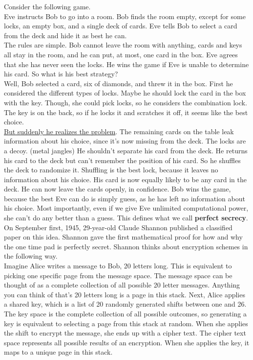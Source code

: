 \documentclass{report}
\begin{document}
Consider the following game.\\
Eve instructs Bob to go into a room. Bob finds the room empty, except for some locks, an empty box, and a single deck of cards. Eve tells Bob to select a card from the deck and hide it as best he can. \\
The rules are simple. Bob cannot leave the room with anything, cards and keys all stay in the room, and he can put, at most, one card in the box. Eve agrees that she has never seen the locks. He wins the game if Eve is unable to determine his card. So what is his best strategy?\\
Well, Bob selected a card, six of diamonds, and threw it in the box. First he considered the different types of locks. Maybe he should lock the card in the box with the key. Though, she could pick locks, so he considers the combination lock. The key is on the back, so if he locks it and scratches it off, it seems like the best choice. \\
\underline{But suddenly he realizes the problem}. The remaining cards on the table leak information about his choice, since it's now missing from the deck. The locks are a decoy. (metal jangles) He shouldn't separate his card from the deck. He returns his card to the deck but can't remember the position of his card. So he shuffles the deck to randomize it. Shuffling is the best lock, because it leaves no information about his choice. His card is now equally likely to be any card in the deck. He can now leave the cards openly, in confidence. Bob wins the game, because the best Eve can do is simply guess, as he has left no information about his choice. Most importantly, even if we give Eve unlimited computational power, she can't do any better than a guess. This defines what we call \textbf{perfect secrecy}.
On September first, 1945, 29-year-old Claude Shannon published a classified paper on this idea. Shannon gave the first mathematical proof for how and why the one time pad is perfectly secret. Shannon thinks about encryption schemes in the following way. \\
Imagine Alice writes a message to Bob, 20 letters long. This is equivalent to picking one specific page from the message space. The message space can be thought of as a complete collection of all possible 20 letter messages. Anything you can think of that's 20 letters long is a page in this stack. Next, Alice applies a shared key, which is a list of 20 randomly generated shifts between one and 26. The key space is the complete collection of all possible outcomes, so generating a key is equivalent to selecting a page from this stack at random. When she applies the shift to encrypt the message, she ends up with a cipher text. The cipher text space represents all possible results of an encryption. When she applies the key, it maps to a unique page in this stack. \\
\end{document}

